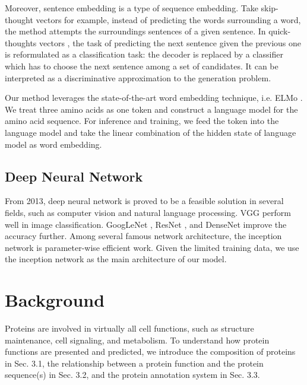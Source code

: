 \documentclass{article}
\begin{document}
        Moreover, sentence embedding is a type of sequence embedding. Take skip-thought vectors \citep{DBLP:journals/corr/KirosZSZTUF15} for example, instead of predicting the words surrounding a word, the method attempts  the surroundings sentences of a given sentence. In quick-thoughts vectors \citep{logeswaran2018an}, the task of predicting the next sentence given the previous one is reformulated as a classification task: the decoder is replaced by a classifier which has to choose the next sentence among a set of candidates. It can be interpreted as a discriminative approximation to the generation problem. \par
        
        Our method leverages the state-of-the-art word embedding technique, i.e. ELMo \citep{Peters:2018}. We treat three amino acids as one token and construct a language model for the amino acid sequence. For inference and training, we feed the token into the language model and take the linear combination of the hidden state of language model as word embedding. 
    
    \subsection{Deep Neural Network}
    
        From 2013, deep neural network is proved to be a feasible solution in several fields, such as computer vision and natural language processing. VGG \citep{DBLP:journals/corr/SimonyanZ14a} perform well in image classification. GoogLeNet \citep{szegedy2015going}, ResNet \citep{DBLP:journals/corr/HeZRS15}, and DenseNet \citep{DBLP:journals/corr/HuangLW16a} improve the accuracy further. Among several famous network architecture, the inception network is parameter-wise efficient work. Given the limited training data, we use the inception network as the main architecture of our model.

\section{Background}
    Proteins are involved in virtually all cell functions, such as structure maintenance, cell signaling, and metabolism. To understand how protein functions are presented and predicted, we introduce the composition of proteins in Sec. 3.1, the relationship between a protein function and the protein sequence(s) in Sec. 3.2, and the protein annotation system in Sec. 3.3.
\end{document}
